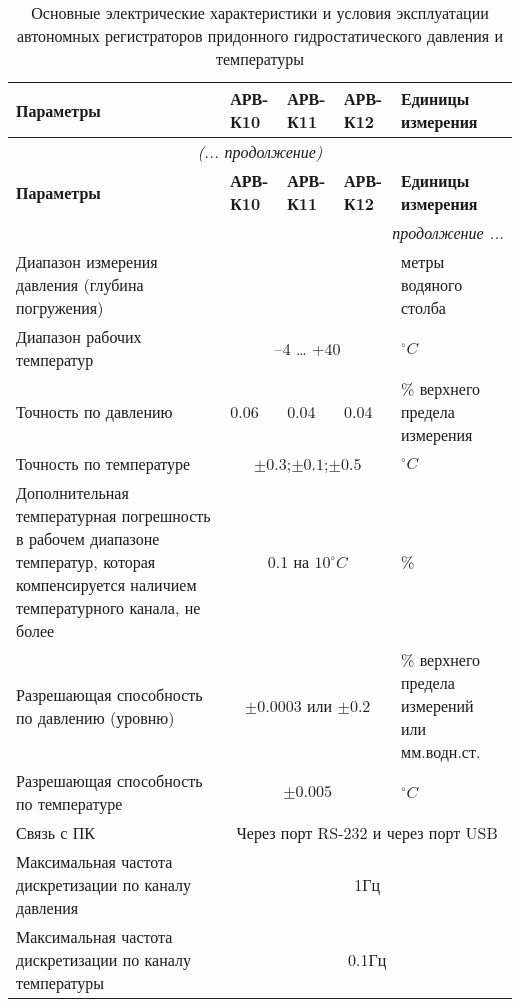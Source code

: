 \begin{longtable}{|X |X |X |X| X|}
\caption{Основные электрические характеристики и условия эксплуатации автономных регистраторов придонного гидростатического давления и температуры}\label{tbl:charact}\\
    \hline
        \textbf{Параметры} & \textbf{АРВ-К10} & \textbf{АРВ-К11} & \textbf{АРВ-К12} & \textbf{Единицы измерения} \\
    \hline
        \endfirsthead
    \hline
        \multicolumn{5}{c}{\small\slshape (... продолжение)} \\
    \hline
        \textbf{Параметры} & \textbf{АРВ-К10}&\textbf{АРВ-К11}& \textbf{АРВ-К12} & \textbf{Единицы измерения} \\
    \hline
        \endhead
    \hline
        \multicolumn{5}{|r|}{\small\slshape продолжение ...}  \\
    \hline
        \endfoot
    \hline
        \endlastfoot
    \hline
        Диапазон измерения давления (глубина погружения)   & &  & & метры водяного столба\\
  \hline
        Диапазон рабочих температур  & \multicolumn{3}{|c|}{–4 … +40}& $^{\circ}C$ \\
  \hline
        Точность по давлению & 0.06 & 0.04 & 0.04 &  \% верхнего предела измерения \\
  \hline
        Точность по температуре & \multicolumn{3}{|c|}{$\pm0.3$;$\pm0.1$;$\pm0.5$} & $^{\circ}C$ \\
  \hline
        Дополнительная температурная погрешность в рабочем диапазоне температур, которая компенсируется наличием температурного канала, не более & \multicolumn{3}{|c|}{0.1 на $10^{\circ}C$ }& \% \\
  \hline
        Разрешающая способность по давлению (уровню) & \multicolumn{3}{|c|}{$\pm0.0003$ или $\pm0.2$}& \% верхнего предела измерений или мм.водн.ст. \\
  \hline
        Разрешающая способность по температуре & \multicolumn{3}{|c|}{$\pm0.005$}& $^{\circ}C$  \\
  \hline
        Связь с ПК & \multicolumn{4}{|c|}{Через порт RS-232 и через порт USB} \\
  \hline
        Максимальная частота дискретизации по каналу давления & \multicolumn{4}{|c|}{1Гц} \\
  \hline
        Максимальная частота дискретизации по каналу температуры & \multicolumn{4}{|c|}{0.1Гц} \\

\end{longtable}
